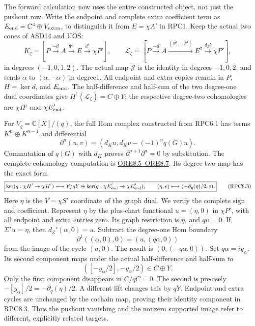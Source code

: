 The forward calculation now uses the entire constructed object, not just
the pushout row. Write the endpoint and complete extra coefficient term
as \(E_{\rm end}=\mathbb C^4\oplus V_{\rm extra}\), to distinguish it
from \(E=\chi A'\) in RPC1. Keep the actual two cones of ASD14 and UOS:
\[
K_\zeta=[P\xrightarrow{-d}A\xrightarrow{\Psi^1}E\xrightarrow{d'}\chi P'],
\qquad
\mathcal L_\zeta=[P\xrightarrow{-d}A\xrightarrow{(\Psi^1,-\Psi^1)}E^2\xrightarrow{d_Z'}\chi P'],
\tag{RPC8.1}
\] in degrees \((-1,0,1,2)\). The actual map \(\mathcal J\) is the
identity in degrees \(-1,0,2\), and sends \(\alpha\) to
\((\alpha,-\alpha)\) in degree1. All endpoint and extra copies remain in
\(P\), \(H=\ker d\), and \(E_{\rm end}\). The half-difference and
half-sum of the two degree-one dual coordinates give
\(H^1(\mathcal L_\zeta)=C\oplus Y\); the respective degree-two
cohomologies are \(\chi H'\) and \(\chi E_{\rm end}'\).

For \(V_q=\mathbb C[X]/(q)\), the full Hom complex constructed from
RPC6.1 has terms \(K^n\oplus K^{n-1}\) and differential \[
\partial^n(u,v)=(d_Ku,d_Kv-(-1)^nq(G)u).
\tag{RPC8.2}
\] Commutation of \(q(G)\) with \(d_K\) proves
\(\partial^{n+1}\partial^n=0\) by substitution. The complete cohomology
computation is
\href{ORIGINAL_RESTRICTION_EXTENSION_AND_DELIGNE_CROSS.md}{ORE8.5--ORE8.7}.
Its degree-two map has the exact form \[
\boxed{\ker(q:\chi H'\to\chi H')\longrightarrow
Y/qY\oplus\ker(q:\chi E_{\rm end}'\to\chi E_{\rm end}'),
\qquad(\eta,e)\longmapsto(-\partial_q(\eta)/2,e).}
\tag{RPC8.3}
\] Here \(\eta\) is the \(V=\chi S'\) coordinate of the graph dual. We
verify the complete sign and coefficient. Represent \(\eta\) by the
plus-chart functional \(u=(\eta,0)\) in \(\chi P'\), with all endpoint
and extra entries zero. Its graph restriction is \(\eta\), and
\(q u=0\). If \(\Sigma'\alpha=\eta\), then \(d_Z'(\alpha,0)=u\).
Subtract the degree-one Hom boundary \[
\partial^1((\alpha,0),0)=(u,(q\alpha,0))
\] from the image of the cycle \((u,0)\). The result is
\((0,(-q\alpha,0))\). Set \(q\alpha=iy_\alpha\). Its second component
maps under the actual half-difference and half-sum to \[
([-y_\alpha/2],-y_\alpha/2)\in C\oplus Y.
\] Only the first component disappears in \(C/qC=0\). The second is
precisely \(-[y_\alpha]/2=-\partial_q(\eta)/2\). A different lift
changes this by \(qY\). Endpoint and extra cycles are unchanged by the
cochain map, proving their identity component in RPC8.3. Thus the
pushout vanishing and the nonzero supported image refer to different,
explicitly related targets.

